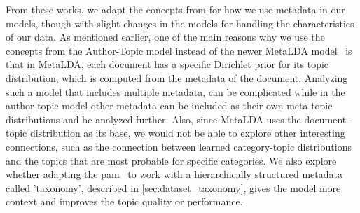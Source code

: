 From these works, we adapt the concepts from \citet{author_topic_2012} for how we use metadata in our models, though with slight changes in the models for handling the characteristics of our data.
As mentioned earlier, one of the main reasons why we use the concepts from the Author-Topic model instead of the newer MetaLDA model~\cite{MetaLDA2017} is that in MetaLDA, each document has a specific Dirichlet prior for its topic distribution, which is computed from the metadata of the document.
Analyzing such a model that includes multiple metadata, can be complicated while in the author-topic model other metadata can be included as their own meta-topic distributions and be analyzed further.
Also, since MetaLDA uses the document-topic distribution as its base, we would not be able to explore other interesting connections, such as the connection between learned category-topic distributions and the topics that are most probable for specific categories.
We also explore whether adapting the \gls{pam}~\cite{li2006pachinko} to work with a hierarchically structured metadata called 'taxonomy', described in \autoref{sec:dataset_taxonomy}, gives the model more context and improves the topic quality or performance.
